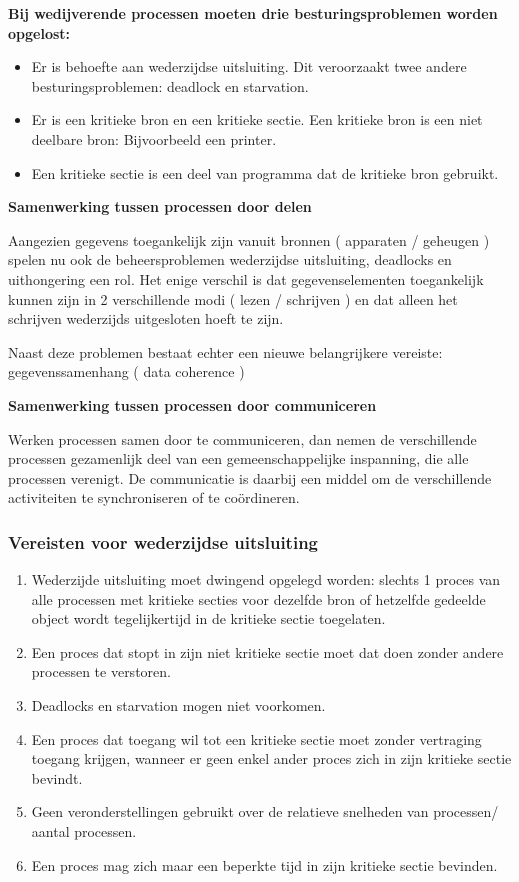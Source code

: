 \textbf{Bij wedijverende processen moeten drie besturingsproblemen worden opgelost:}

\begin{itemize}
\item Er is behoefte aan wederzijdse uitsluiting. Dit veroorzaakt twee andere besturingsproblemen: deadlock en starvation.
\item Er is een kritieke bron en een kritieke sectie. Een kritieke bron is een niet deelbare bron: Bijvoorbeeld een printer.
\item Een kritieke sectie is een deel van programma dat de kritieke bron gebruikt.
\end{itemize}

\textbf{Samenwerking tussen processen door delen}

Aangezien gegevens toegankelijk zijn vanuit bronnen ( apparaten / geheugen ) spelen nu ook de beheersproblemen wederzijdse uitsluiting, deadlocks en uithongering een rol. Het enige verschil is dat gegevenselementen toegankelijk kunnen zijn in 2 verschillende modi ( lezen / schrijven ) en dat alleen het schrijven wederzijds uitgesloten hoeft te zijn.

Naast deze problemen bestaat echter een nieuwe belangrijkere vereiste: gegevenssamenhang ( data coherence )

\textbf{Samenwerking tussen processen door communiceren}

Werken processen samen door te communiceren, dan nemen de verschillende processen gezamenlijk deel van een gemeenschappelijke inspanning, die alle processen verenigt. De communicatie is daarbij een middel om de verschillende activiteiten te synchroniseren of te coördineren.

\subsubsection{Vereisten voor wederzijdse uitsluiting}

\begin{enumerate}
\item Wederzijde uitsluiting moet dwingend opgelegd worden: slechts 1 proces van alle processen met kritieke secties voor dezelfde bron of hetzelfde gedeelde object wordt tegelijkertijd in de kritieke sectie toegelaten.
\item Een proces dat stopt in zijn niet kritieke sectie moet dat doen zonder andere processen te verstoren.
\item Deadlocks en starvation mogen niet voorkomen.
\item Een proces dat toegang wil tot een kritieke sectie moet zonder vertraging toegang krijgen, wanneer er geen enkel ander proces zich in zijn kritieke sectie bevindt.
\item Geen veronderstellingen gebruikt over de relatieve snelheden van processen/ aantal processen.
\item Een proces mag zich maar een beperkte tijd in zijn kritieke sectie bevinden.
\end{enumerate}